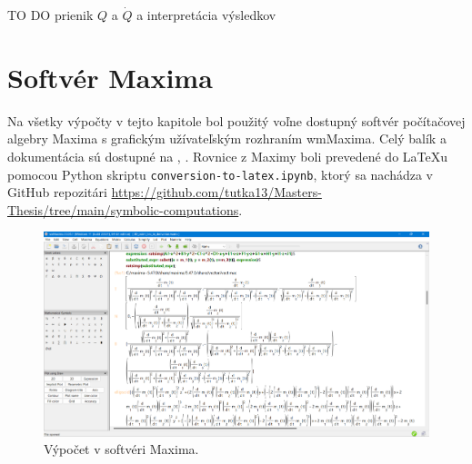 TO DO prienik $Q$ a $\dot{Q}$ a interpretácia výsledkov

\section{Softvér Maxima}
Na všetky výpočty v tejto kapitole bol použitý voľne dostupný softvér počítačovej algebry Maxima s grafickým užívateľským rozhraním wmMaxima. Celý balík a dokumentácia sú dostupné na \cite{MaximaDoc}, \cite{MaximaDownload}. Rovnice z Maximy boli prevedené do \LaTeX u pomocou Python skriptu \verb|conversion-to-latex.ipynb|, ktorý sa nachádza v GitHub repozitári \url{https://github.com/tutka13/Masters-Thesis/tree/main/symbolic-computations}.

\begin{figure}[h]
	\centering
	\includegraphics[width=\textwidth]{images/maxima.png}
	\caption[Softvér Maxima.]{Výpočet v softvéri Maxima.}
	\label{fig:3D_point_lies}
\end{figure}

